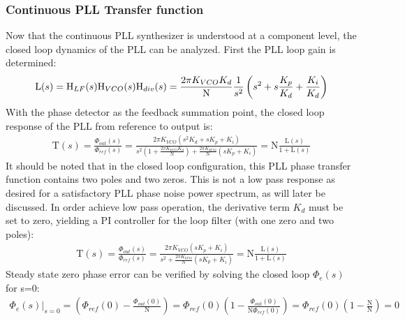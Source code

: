 		\subsubsection{Continuous PLL Transfer function}\label{cont_pll_tf}
			Now that the continuous PLL synthesizer is understood at a component level, the closed loop dynamics of the PLL can be analyzed. First the PLL loop gain is determined:
			\begin{equation}
				\mathrm{L}(s) = \textnormal{H}_{LF}(s)\textnormal{H}_{VCO}(s)\textnormal{H}_{div}(s) = \frac{2\pi K_{VCO}K_d}{\mathrm{N}}\frac{1}{s^2}\left(s^2 + s\frac{K_p}{K_d} + \frac{K_i}{K_d}\right)
			\end{equation}
			With the phase detector as the feedback summation point, the closed loop response of the PLL from reference to output is:
			\begin{align} \label{eq:pid_pll_tf}
				\mathrm{T}(s) = \frac{\Phi_{out}(s)}{\Phi_{ref}(s)} = \frac{2\pi K_{VCO}\left(s^2K_d + sK_p + K_i\right)}{s^2\left(1 + \frac{2\pi K_{VCO}K_d}{\mathrm{N}}\right) + \frac{2\pi K_{VCO}}{\mathrm{N}}\left(sK_p + K_i\right)} = \mathrm{N}\frac{\mathrm{L}(s)}{1 + \mathrm{L}(s)}
			\end{align}
			It should be noted that in the closed loop configuration, this PLL phase transfer function contains two poles and two zeros. This is not a low pass response as desired for a satisfactory PLL phase noise power spectrum, as will later be discussed. In order achieve low pass operation, the derivative term $K_d$ must be set to zero, yielding a PI controller for the loop filter (with one zero and two poles):
			\begin{align} \label{eq:full_pi_pll_tf}
				\mathrm{T}(s) = \frac{\Phi_{out}(s)}{\Phi_{ref}(s)} = \frac{2\pi K_{VCO}\left(sK_p + K_i\right)}{s^2 + \frac{2\pi K_{VCO}}{\mathrm{N}}\left(sK_p + K_i\right)} = \mathrm{N}\frac{\mathrm{L}(s)}{1 + \mathrm{L}(s)} 
			\end{align}
			Steady state zero phase error can be verified by solving the closed loop $\Phi_e(s)$ for s=0:
			\begin{align}
				\left.\Phi_e(s)\right\vert_{s=0} = \left(\Phi_{ref}(0) - \frac{\Phi_{out}(0)}{\mathrm{N}}\right) = \Phi_{ref}(0)\left(1 - \frac{\Phi_{out}(0)}{\mathrm{N}\Phi_{ref}(0)}\right)= \Phi_{ref}(0)\left(1 - \frac{\mathrm{N}}{\mathrm{N}}\right) = 0
			\end{align}

